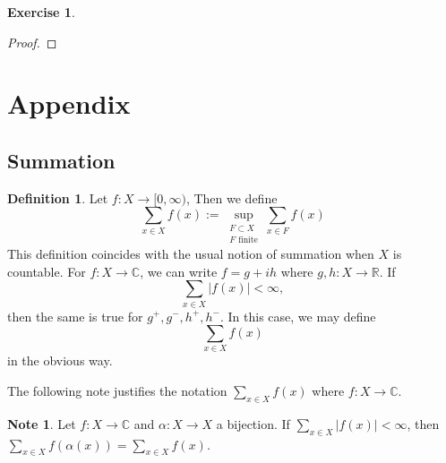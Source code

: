\documentclass[12pt]{amsart}
\theoremstyle{definition}
\newtheorem{defn}[definition]{Definition}
\newtheorem{note}[definition]{Note}
\newtheorem{ex}[definition]{Exercise}
\newcommand{\al}{\alpha}
\newcommand{\C}{\mathbb{C}}
\newcommand{\R}{\mathbb{R}}
\newcommand{\Rg}{[0,\infty)}
\begin{document}
	\begin{ex}
	
	\end{ex}
	
	\begin{proof}
	
\end{proof}		
	
	\newpage
	
	
	
	
	
	
	
	
	
	
	
	
	
	
	
	
	
	
	
	
	
	
	
	

	
	

	
	\section{Appendix}
	
	\subsection{Summation}
	
	\begin{defn}
		Let $f:X \rightarrow \Rg$, Then we define $$\sum_{x \in X} f(x) := \sup_{\substack{F \subset X \\ F \text{ finite}}} \sum_{x \in F} f(x)$$ This definition coincides with the usual notion of summation when $X$ is countable. For $f:X \rightarrow \C$, we can write $f = g +ih$ where $g,h:X \rightarrow \R$. If $$\sum_{x \in X}|f(x)| < \infty,$$ then the same is true for $g^+,g^-,h^+,h^-$. In this case, we may define $$\sum_{x \in X} f(x)$$ in the obvious way.
	\end{defn} 
	
	The following note justifies the notation $\sum_{x \in X}f(x)$ where $f:X \rightarrow \C$.
	
	\begin{note}
		Let $f:X \rightarrow \C$ and $\al:X \rightarrow X$ a bijection. If $\sum_{x \in X}|f(x)|< \infty$, then $\sum_{x \in X}f( \al (x)) = \sum_{x \in X}f(x) $.
	\end{note}
	
\end{document}
